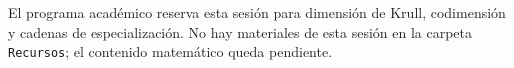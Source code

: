 \begin{nota}
El programa académico reserva esta sesión para dimensión de Krull, codimensión y cadenas de especialización. No hay materiales de esta sesión en la carpeta \texttt{Recursos}; el contenido matemático queda pendiente.
\end{nota}
